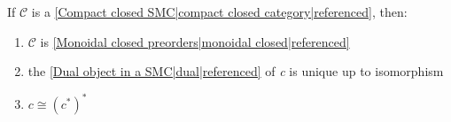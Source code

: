 
If $\mathcal{C}$ is a \ref{Compact closed SMC|compact closed category|referenced}, then:
    \begin{enumerate}
      \item $\mathcal{C}$ is \ref{Monoidal closed preorders|monoidal closed|referenced}
      \item the \ref{Dual object in a SMC|dual|referenced} of \emph{c} is unique up to isomorphism
      \item $c \cong (c^*)^*$
    \end{enumerate}